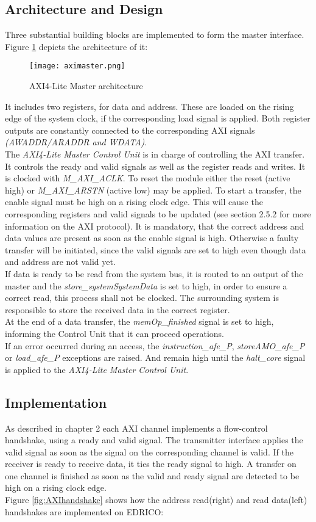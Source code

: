\subsection{Architecture and Design}
Three substantial building blocks are implemented to form the master interface.
Figure \ref{fig:aximaster} depicts the architecture of it:
\begin{figure}[H]
	\centering
	\texttt{[image: aximaster.png]}
	\caption{AXI4-Lite Master architecture}
	\label{fig:aximaster}
\end{figure}
It includes two registers, for data and address. These are loaded on the rising edge of the system clock, if the corresponding load signal is applied. Both register outputs are constantly connected to the corresponding \ac{AXI} signals \textit{(AWADDR/ARADDR and WDATA)}.\\
The \textit{AXI4-Lite Master Control Unit} is in charge of controlling the \ac{AXI} transfer. It controls the ready and valid signals as well as the register reads and writes. It is clocked with \textit{M\_AXI\_ACLK}. To reset the module either the reset (active high) or \textit{M\_AXI\_ARSTN} (active low) may be applied. To start a transfer, the enable signal must be high on a rising clock edge. This will cause the corresponding registers and valid signals to be updated (see section 2.5.2 for more information on the \ac{AXI} protocol). It is mandatory, that the correct address and data values are present as soon as the enable signal is high. Otherwise a faulty transfer will be initiated, since the valid signals are set to high even though data and address are not valid yet. \\
If data is ready to be read from the system bus, it is routed to an output of the master and the \textit{store\_systemSystemData} is set to high, in order to ensure a correct read, this process shall not be clocked. The surrounding system is responsible to store the received data in the correct register.\\
At the end of a data transfer, the \textit{memOp\_finished} signal is set to high, informing the Control Unit that it can proceed operations.\\
If an error occurred during an access, the \textit{instruction\_afe\_P}, \textit{storeAMO\_afe\_P} or \textit{load\_afe\_P} exceptions are raised. And remain high until the \textit{halt\_core} signal is applied to the \textit{AXI4-Lite Master Control Unit}.
\subsection{Implementation}
As described in chapter 2 each \ac{AXI} channel implements a flow-control handshake, using a ready and valid signal. The transmitter interface applies the valid signal as soon as the signal on the corresponding channel is valid. If the receiver is ready to receive data, it ties the ready signal to high. A transfer on one channel is finished as soon as the valid and ready signal are detected to be high on a rising clock edge.\\
Figure \ref{fig:AXIhandshake} shows how the address read(right) and read data(left) handshakes are implemented on \ac{EDRICO}:

